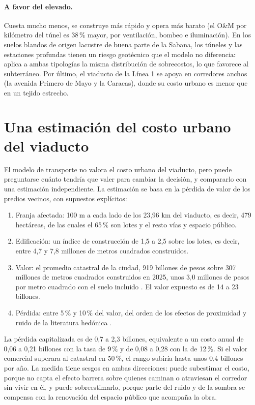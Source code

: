 \paragraph{A favor del elevado.} Cuesta mucho menos, se construye más rápido y opera más barato (el
O\&M por kilómetro del túnel es 38\,\% mayor, por ventilación, bombeo e iluminación). En los suelos
blandos de origen lacustre de buena parte de la Sabana, los túneles y las estaciones profundas tienen
un riesgo geotécnico que el modelo no diferencia: aplica a ambas tipologías la misma distribución de
sobrecostos, lo que favorece al subterráneo. Por último, el viaducto de la Línea 1 se apoya en
corredores anchos (la avenida Primero de Mayo y la Caracas), donde su costo urbano es menor que en un
tejido estrecho.

\section{Una estimación del costo urbano del viaducto}\label{sec:externalidad}

El modelo de transporte no valora el costo urbano del viaducto, pero puede preguntarse cuánto tendría
que valer para cambiar la decisión, y compararlo con una estimación independiente. La estimación se
basa en la pérdida de valor de los predios vecinos, con supuestos explícitos:
\begin{enumerate}[nosep]
\item Franja afectada: 100 m a cada lado de los 23,96 km del viaducto, es decir, 479 hectáreas, de las
      cuales el 65\,\% son lotes y el resto vías y espacio público.
\item Edificación: un índice de construcción de 1,5 a 2,5 sobre los lotes, es decir, entre 4,7 y 7,8
      millones de metros cuadrados construidos.
\item Valor: el promedio catastral de la ciudad, 919 billones de pesos sobre 307 millones de metros
      cuadrados construidos en 2025, unos 3,0 millones de pesos por metro cuadrado con el suelo incluido
      \citep{catastro2025}. El valor expuesto es de 14 a 23 billones.
\item Pérdida: entre 5\,\% y 10\,\% del valor, del orden de los efectos de proximidad y ruido de la
      literatura hedónica \citep{strand2001,ahlfeldt2019}.
\end{enumerate}
La pérdida capitalizada es de 0,7 a 2,3 billones, equivalente a un costo anual de 0,06 a 0,21 billones
con la tasa de 9\,\% y de 0,08 a 0,28 con la de 12\,\%. Si el valor comercial superara al catastral
en 50\,\%, el rango subiría hasta unos 0,4 billones por año. La medida tiene sesgos en ambas
direcciones: puede subestimar el costo, porque no capta el efecto barrera sobre quienes caminan o
atraviesan el corredor sin vivir en él, y puede sobreestimarlo, porque parte del ruido y de la sombra
se compensa con la renovación del espacio público que acompaña la obra.


